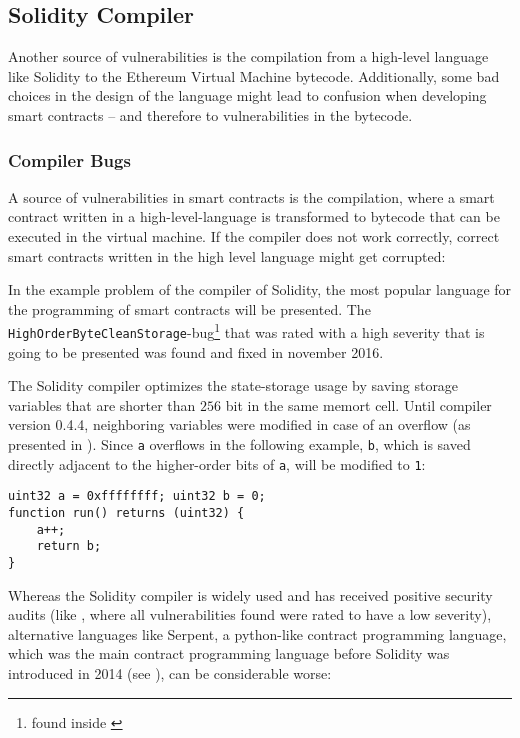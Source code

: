 \subsection{Solidity Compiler}
Another source of vulnerabilities is the compilation from a high-level language like Solidity to the Ethereum Virtual Machine bytecode. Additionally, some bad choices in the design of the language might lead to confusion when developing smart contracts -- and therefore to vulnerabilities in the bytecode.

\subsubsection{Compiler Bugs}
A source of vulnerabilities in smart contracts is the compilation, where a smart contract written in a high-level-language is transformed to bytecode that can be executed in the virtual machine. If the compiler does not work correctly, correct smart contracts written in the high level language might get corrupted:

In the example problem of the compiler of Solidity, the most popular language for the programming of smart contracts will be presented. The \texttt{HighOrderByteCleanStorage}-bug\footnote{found inside \cite{solidity:buglist}} that was rated with a high severity that is going to be presented was found and fixed in november 2016.

The Solidity compiler optimizes the state-storage usage by saving storage variables that are shorter than \( 256 \) bit in the same memort cell. Until compiler version 0.4.4, neighboring variables were modified in case of an overflow (as presented in \cite{ethereum:overflowblogpost}). Since \texttt{a} overflows in the following example, \texttt{b}, which is saved directly adjacent to the higher-order bits of \texttt{a}, will be modified to \texttt{1}:
\begin{verbatim}
uint32 a = 0xffffffff; uint32 b = 0;
function run() returns (uint32) {
    a++;
    return b;
}
\end{verbatim}

Whereas the Solidity compiler is widely used and has received positive security audits (like \cite{augur:solidityaudit}, where all vulnerabilities found were rated to have a low severity), alternative languages like Serpent, a python-like contract programming language, which was the main contract programming language before Solidity was introduced in 2014 (see \cite{wikisource:solidityinventorgavinwood}), can be considerable worse:

